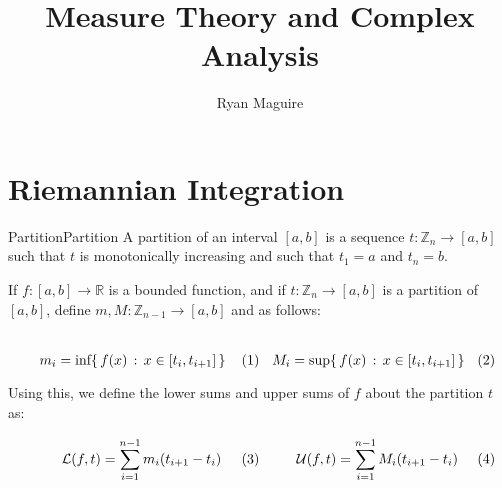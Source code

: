 \documentclass[crop=false,class=article]{standalone}                           %
\begin{document}
    \title{Measure Theory and Complex Analysis}
    \author{Ryan Maguire}
    \date{\vspace{-5ex}}
    \maketitle
    \vspace{10ex}
    \section{Riemannian Integration}
        \begin{fdefinition}{Partition}{Partition}
            A partition of an interval $[a,b]$ is a sequence
            $t:\mathbb{Z}_{n}\rightarrow[a,b]$ such that $t$ is monotonically
            increasing and such that $t_{1}=a$ and $t_{n}=b$.
        \end{fdefinition}
        If $f:[a,b]\rightarrow\mathbb{R}$ is a bounded function, and if
        $t:\mathbb{Z}_{n}\rightarrow[a,b]$ is a partition of $[a,b]$, define
        $m,M:\mathbb{Z}_{n-1}\rightarrow[a,b]$ and as follows:
        \par
        \begin{subequations}
            \begin{minipage}[b]{0.49\textwidth}
                \begin{equation}
                    m_{i}=\textrm{inf}\{\,f(x)\,:\,x\in[t_{i},t_{i+1}]\,\}
                \end{equation}
            \end{minipage}
            \hfill
            \begin{minipage}[b]{0.49\textwidth}
                \begin{equation}
                    M_{i}=\textrm{sup}\{\,f(x)\,:\,x\in[t_{i},t_{i+1}]\,\}
                \end{equation}
            \end{minipage}
        \end{subequations}
        \par\vspace{2.5ex}
        Using this, we define the lower sums and upper sums of $f$ about
        the partition $t$ as:
        \par
        \begin{subequations}
            \begin{minipage}[b]{0.49\textwidth}
                \begin{equation}
                    \mathcal{L}(f,t)=\sum_{i=1}^{n-1}m_{i}(t_{i+1}-t_{i})
                \end{equation}
            \end{minipage}
            \hfill
            \begin{minipage}[b]{0.49\textwidth}
                \begin{equation}
                    \mathcal{U}(f,t)=\sum_{i=1}^{n-1}M_{i}(t_{i+1}-t_{i})
                \end{equation}
            \end{minipage}
        \end{subequations}
\end{document}
